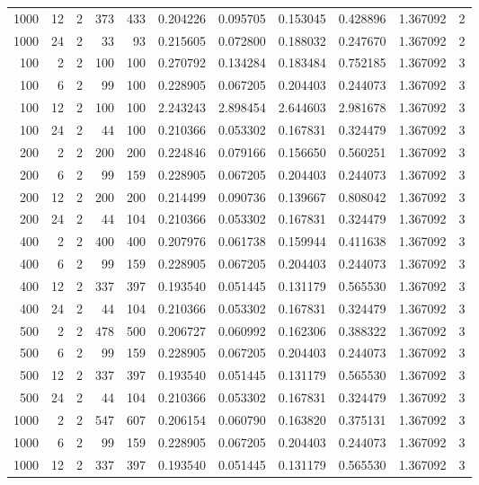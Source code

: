 \begin{table}
\begin{tabular}{rrrrrrrrrrr}
1000 & 12 & 2 & 373 & 433 & 0.204226 & 0.095705 & 0.153045 & 0.428896 & 1.367092 & 2 \\
1000 & 24 & 2 & 33 & 93 & 0.215605 & 0.072800 & 0.188032 & 0.247670 & 1.367092 & 2 \\
100 & 2 & 2 & 100 & 100 & 0.270792 & 0.134284 & 0.183484 & 0.752185 & 1.367092 & 3 \\
100 & 6 & 2 & 99 & 100 & 0.228905 & 0.067205 & 0.204403 & 0.244073 & 1.367092 & 3 \\
100 & 12 & 2 & 100 & 100 & 2.243243 & 2.898454 & 2.644603 & 2.981678 & 1.367092 & 3 \\
100 & 24 & 2 & 44 & 100 & 0.210366 & 0.053302 & 0.167831 & 0.324479 & 1.367092 & 3 \\
200 & 2 & 2 & 200 & 200 & 0.224846 & 0.079166 & 0.156650 & 0.560251 & 1.367092 & 3 \\
200 & 6 & 2 & 99 & 159 & 0.228905 & 0.067205 & 0.204403 & 0.244073 & 1.367092 & 3 \\
200 & 12 & 2 & 200 & 200 & 0.214499 & 0.090736 & 0.139667 & 0.808042 & 1.367092 & 3 \\
200 & 24 & 2 & 44 & 104 & 0.210366 & 0.053302 & 0.167831 & 0.324479 & 1.367092 & 3 \\
400 & 2 & 2 & 400 & 400 & 0.207976 & 0.061738 & 0.159944 & 0.411638 & 1.367092 & 3 \\
400 & 6 & 2 & 99 & 159 & 0.228905 & 0.067205 & 0.204403 & 0.244073 & 1.367092 & 3 \\
400 & 12 & 2 & 337 & 397 & 0.193540 & 0.051445 & 0.131179 & 0.565530 & 1.367092 & 3 \\
400 & 24 & 2 & 44 & 104 & 0.210366 & 0.053302 & 0.167831 & 0.324479 & 1.367092 & 3 \\
500 & 2 & 2 & 478 & 500 & 0.206727 & 0.060992 & 0.162306 & 0.388322 & 1.367092 & 3 \\
500 & 6 & 2 & 99 & 159 & 0.228905 & 0.067205 & 0.204403 & 0.244073 & 1.367092 & 3 \\
500 & 12 & 2 & 337 & 397 & 0.193540 & 0.051445 & 0.131179 & 0.565530 & 1.367092 & 3 \\
500 & 24 & 2 & 44 & 104 & 0.210366 & 0.053302 & 0.167831 & 0.324479 & 1.367092 & 3 \\
1000 & 2 & 2 & 547 & 607 & 0.206154 & 0.060790 & 0.163820 & 0.375131 & 1.367092 & 3 \\
1000 & 6 & 2 & 99 & 159 & 0.228905 & 0.067205 & 0.204403 & 0.244073 & 1.367092 & 3 \\
1000 & 12 & 2 & 337 & 397 & 0.193540 & 0.051445 & 0.131179 & 0.565530 & 1.367092 & 3 \\

\end{tabular}
\end{table}
